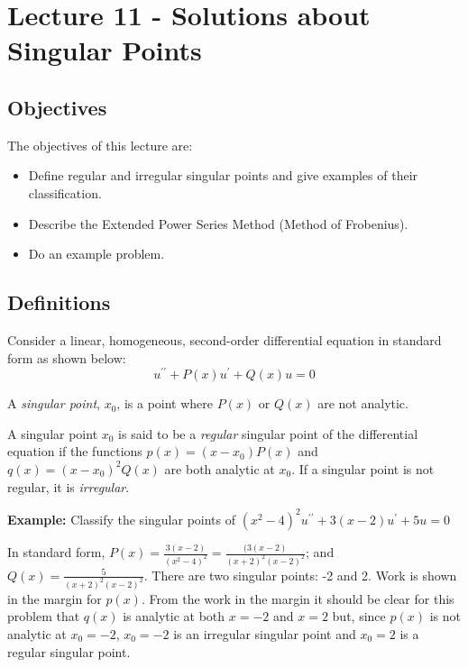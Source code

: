 \chapter{Lecture 11 - Solutions about Singular Points}
\label{ch:lec11}
\section{Objectives}
The objectives of this lecture are:
\begin{itemize}
\item Define regular and irregular singular points and give examples of their classification.
\item Describe the Extended Power Series Method (Method of Frobenius).
\item Do an example problem.
\end{itemize}

\section{Definitions}
Consider a linear, homogeneous, second-order differential equation in standard form as shown below:
\begin{equation*}
u^{\prime \prime} + P(x)u^{\prime} + Q(x)u = 0
\end{equation*}

\begin{definition}
A \emph{singular point}, $x_0$, is a point where $P(x)$ or $Q(x)$ are not analytic.
\end{definition}

\begin{definition}
A singular point $x_0$ is said to be a \emph{regular} singular point of the differential equation if the functions $p(x)=(x-x_0)P(x)$ and $q(x)=(x-x_0)^2Q(x)$ are both analytic at $x_0$.  If a singular point is not regular, it is \emph{irregular}.
\end{definition}

\noindent\textbf{Example:} Classify the singular points of $(x^2-4)^2u^{\prime\prime}+3(x-2)u^{\prime}+5u = 0$

\vspace{0.5cm}

\noindent In standard form, $P(x) = \frac{3(x-2)}{(x^2-4)^2} = \frac{(3(x-2)}{(x+2)^2(x-2)^2}$; and $Q(x) = \frac{5}{(x+2)^2(x-2)^2}$.  There are two singular points: -2 and 2.
Work is shown in the margin for $p(x)$.  From the work in the margin it should be clear for this problem that $q(x)$ is analytic at both $x=-2$ and $x=2$ but, since $p(x)$ is not analytic at $x_0=-2$, $x_0=-2$ is an irregular singular point and $x_0=2$ is a regular singular point.


